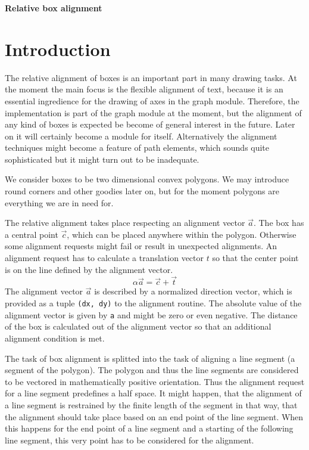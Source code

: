 \documentclass{article}
\begin{document}
\noindent\textbf{\huge Relative box alignment}\medskip
\section{Introduction}
The relative alignment of boxes is an important part in many drawing
tasks. At the moment the main focus is the flexible alignment of text,
because it is an essential ingredience for the drawing of axes in the
graph module. Therefore, the implementation is part of the graph
module at the moment, but the alignment of any kind of boxes is
expected be become of general interest in the future. Later on it will
certainly become a module for itself. Alternatively the alignment
techniques might become a feature of path elements, which sounds quite
sophisticated but it might turn out to be inadequate.

We consider boxes to be two dimensional convex polygons. We may
introduce round corners and other goodies later on, but for the moment
polygons are everything we are in need for.

The relative alignment takes place respecting an alignment vector
$\vec a$. The box has a central point $\vec c$, which can be placed
anywhere within the polygon. Otherwise some alignment requests might
fail or result in unexpected alignments. An alignment request has to
calculate a translation vector $t$ so that the center point is on the
line defined by the alignment vector.
\begin{equation}
\label{eq:center}
\alpha\vec a=\vec c+\vec t
\end{equation}
The alignment vector $\vec a$ is described by a normalized direction
vector, which is provided as a tuple \verb|(dx, dy)| to the alignment
routine. The absolute value of the alignment vector is given by
\verb|a| and might be zero or even negative. The distance of the box
is calculated out of the alignment vector so that an additional
alignment condition is met.

The task of box alignment is splitted into the task of aligning a line
segment (a segment of the polygon). The polygon and thus the line
segments are considered to be vectored in mathematically positive
orientation. Thus the alignment request for a line segment predefines
a half space. It might happen, that the alignment of a line segment
is restrained by the finite length of the segment in that way, that
the alignment should take place based on an end point of the line
segment. When this happens for the end point of a line segment and a
starting of the following line segment, this very point has to be
considered for the alignment.
\end{document}
